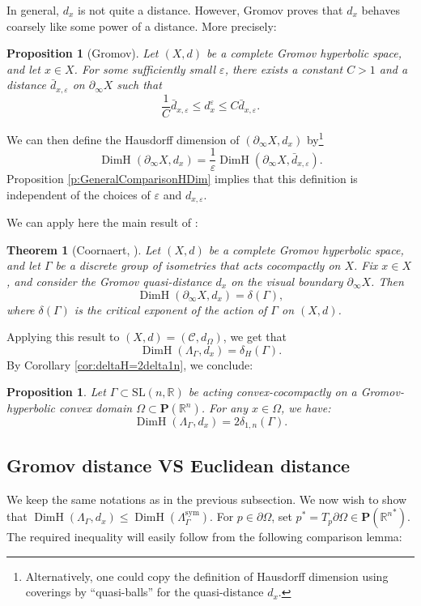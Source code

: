\documentclass[11pt]{article}
\numberwithin{equation}{section}
\newtheorem{theorem}[theo]{Theorem}
\newtheorem{prop}[theo]{Proposition}
\theoremstyle{definition}
\newcommand{\proj}{\mathbf{P}}
\newcommand{\R}{\mathbb{R}}
\newcommand{\cC}{\mathcal{C}}
\newcommand{\SL}{\mathrm{SL}}
\DeclareMathOperator{\DimH}{DimH}
\let\epsilon\varepsilon
\let\G\Gamma
\begin{document}
In general, $d_x$ is not quite a distance. However, Gromov proves that $d_x$ behaves coarsely like some power of a distance. More precisely:
\begin{prop}[Gromov] Let $(X,d)$ be a complete Gromov hyperbolic space, and let $x\in X$. For some sufficiently small $\epsilon$, there exists a constant $C>1$ and a distance $\bar d_{x,\epsilon}$ on $\partial_\infty X$ such that
\[\frac{1}{C} \bar d_{x,\epsilon} \leq d_x^\epsilon \leq C \bar d_{x,\epsilon}.\]
\end{prop}
We can then define the Hausdorff dimension of $(\partial_\infty X, d_x)$ by\footnote{Alternatively, one could copy the definition of Hausdorff dimension using coverings by ``quasi-balls'' for the quasi-distance $d_x$.}
\[\DimH(\partial_\infty X, d_x) = \frac{1}{\epsilon} \DimH(\partial_\infty X, \bar d_{x,\epsilon}).\]
Proposition \ref{p:GeneralComparisonHDim} implies that this definition is independent of the choices of $\epsilon$ and $d_{x,\epsilon}$.

We can apply here the main result of \cite{Coornaert}:

\begin{theorem}[Coornaert, \cite{Coornaert}] \label{theo - coornaert}
Let $(X,d)$ be a complete Gromov hyperbolic space, and let $\G$ be a discrete group of isometries that acts cocompactly on $X$. Fix $x\in X$, and consider the Gromov quasi-distance $d_x$ on the visual boundary $\partial_\infty X$. Then \[\DimH(\partial_\infty X,d_x)= \delta(\G),\] where $\delta(\G)$ is the critical exponent of the action of $\G$ on $(X,d)$.
\end{theorem}
Applying this result to $(X,d)=(\cC,d_\Omega)$, we get that \[\DimH(\Lambda_\G,d_x)=\delta_H(\G).\] By Corollary \ref{cor:deltaH=2delta1n}, we conclude:

\begin{prop} \label{prop - dimension Gromov = exposant critique} Let $\G\subset \SL(n,\R)$ be acting convex-cocompactly on a Gromov-hyperbolic convex domain $\Omega\subset\proj(\R^n)$. For any $x\in \Omega$, we have:
\[ \DimH(\Lambda_\G,d_x)=2\delta_{1,n}(\G).\]
\end{prop}

\subsection{Gromov distance VS Euclidean distance}

We keep the same notations as in the previous subsection. We now wish to show that $\DimH(\Lambda_\G,d_x)\leq \DimH(\Lambda_\G^{\mathrm{sym}})$. For $p\in \partial \Omega$, set $p^*=T_p\partial\Omega \in \proj({\R^n}^*)$. The required inequality will easily follow from the following comparison lemma:
\end{document}
